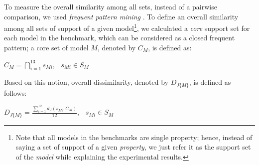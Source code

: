 \iffalse
{}

To measure the overall similarity among all sets, instead of a pairwise comparison, we used \emph{frequent pattern mining} \cite{han2007frequent}. To define an overall similarity among all sets of support of a given model\footnote{Note that all models in the benchmarks are single property; hence, instead of saying a set of support of a given \emph{property}, we just refer it as the support set of the \emph{model} while explaining the experimental results.}, we calculated a \emph{core} support set for each model in the benchmark, which can be considered as a closed frequent pattern; a core set of model $M$, denoted by $C_M$, is defined as:
\begin{definition}
  \label{def:core}
  $C_M = \bigcap_{i=1}^{13} s_{Mi},   \hspace{9pt} s_{Mi} \in S_M$
\end{definition}

Based on this notion, overall dissimilarity, denoted by $D_{J\{M\}}$, is defined as follows:

\begin{definition}
  \label{def:dis}
  $D_{J\{M\}} =  \frac{\sum_{i=1}^{12}d_J(s_{Mi}, C_M)}{12},   \hspace{9pt} s_{Mi} \in S_M$
\end{definition}


